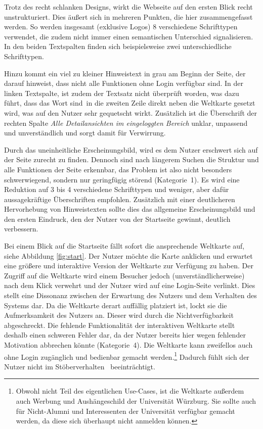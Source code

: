 {Trotz des recht schlanken Designs, wirkt die Webseite auf den ersten Blick recht unstrukturiert. Dies äußert sich in mehreren Punkten, die hier zusammengefasst werden. 
So werden insgesamt (exklusive Logos) 8 verschiedene Schrifttypen verwendet, die zudem nicht immer einen semantischen Unterschied signalisieren. In den beiden Textspalten finden sich beispielsweise zwei unterschiedliche Schrifttypen. 

Hinzu kommt ein viel zu kleiner Hinweistext in grau am Beginn der Seite, der darauf hinweist, dass nicht alle Funktionen ohne Login verfügbar sind.
In der linken Textspalte, ist zudem der Textsatz nicht überprüft worden, was dazu führt, dass das Wort \glqq sind\grqq~in die zweiten Zeile direkt neben die Weltkarte gesetzt wird, was auf den Nutzer sehr gequetscht wirkt.
Zusätzlich ist die Überschrift der rechten Spalte \emph{Alle Detailansichten im eingeloggten Bereich} unklar, unpassend und unverständlich und sorgt damit für Verwirrung.
}
{Durch das uneinheitliche Erscheinungsbild, wird es dem Nutzer erschwert sich auf der Seite zurecht zu finden. Dennoch sind nach längerem Suchen die Struktur und alle Funktionen der Seite erkennbar, das Problem ist also nicht besonders schwerwiegend, sondern nur geringfügig störend (Kategorie~1).
}
{Es wird eine Reduktion auf 3 bis 4 verschiedene Schrifttypen und weniger, aber dafür aussagekräftige Überschriften empfohlen. Zusätzlich mit einer deutlicheren Hervorhebung von Hinweistexten sollte dies das allgemeine Erscheinungsbild und den ersten Eindruck, den der Nutzer von der Startseite gewinnt, deutlich verbessern.
}\label{prob:start:erschbild}

{Bei einem Blick auf die Startseite fällt sofort die ansprechende Weltkarte auf, siehe Abbildung \ref{fig:start}. 
Der Nutzer möchte die Karte anklicken und erwartet eine größere und interaktive Version der Weltkarte zur Verfügung zu haben.
Der Zugriff auf die Weltkarte wird einem Besucher jedoch (unverständlicherweise) nach dem Klick verwehrt und der Nutzer wird auf eine Login-Seite verlinkt. 
Dies stellt eine Dissonanz zwischen der Erwartung des Nutzers und dem Verhalten des Systems dar.
}{Da die Weltkarte derart auffällig platziert ist, lockt sie die Aufmerksamkeit des Nutzers an. Dieser wird durch die Nichtverfügbarkeit abgeschreckt. 
Die fehlende Funktionalität der interaktiven Weltkarte stellt deshalb einen schweren Fehler dar, da der Nutzer bereits hier wegen fehlender Motivation abbrechen könnte (Kategorie~4).}
{Die Weltkarte kann zweifellos auch ohne Login zugänglich und bedienbar gemacht werden.\footnote{Obwohl nicht Teil des eigentlichen Use-Cases, ist die Weltkarte außerdem auch Werbung und Aushängeschild der Universität Würzburg. Sie sollte auch für Nicht-Alumni und Interessenten der Universität verfügbar gemacht werden, da diese sich überhaupt nicht anmelden können.}
Dadurch fühlt sich der Nutzer nicht im \glqq Stöberverhalten\grqq~ beeinträchtigt.
}\label{prob:start:weltkarte}

